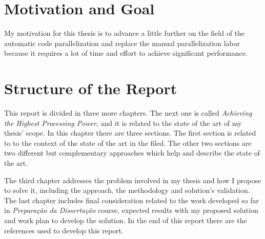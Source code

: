 

\section{Motivation and Goal} \label{sec:goals}

My motivation for this thesis is to advance a little further on the field of the automatic code parallelization  and replace the manual parallelization labor because it requires a lot of time and effort to achieve significant performance.


\section{Structure of the Report} \label{sec:struct}


This report is divided in three more chapters. The next one is called \textit{Achieving the Highest Processing Power}, and it is related to the state of the art of my thesis' scope. In this chapter there are three sections. The first section is related to to the context of the state of the art in the filed. The other two sections are two different but complementary approaches which help and describe the state of the art. 

The third chapter addresses the problem involved in my thesis and how I propose to solve it, including the approach, the methodology and solution's validation. The last chapter  includes final consideration related to the work developed so far in \textit{Preparação da Dissertação} course, expected results with my proposed solution and work plan to develop the solution. In the end of this report there are the references used to develop this report.
